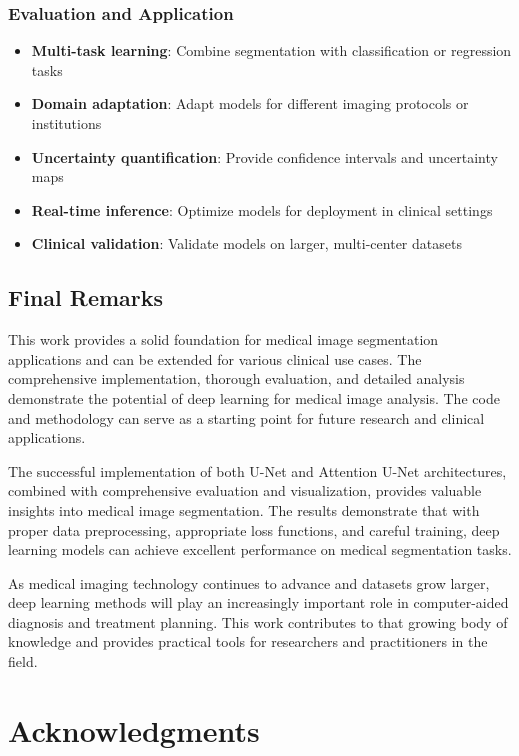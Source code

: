 \documentclass[12pt,a4paper]{article}
\begin{document}
\subsubsection{Evaluation and Application}
\begin{itemize}
    \item \textbf{Multi-task learning}: Combine segmentation with classification or regression tasks
    \item \textbf{Domain adaptation}: Adapt models for different imaging protocols or institutions
    \item \textbf{Uncertainty quantification}: Provide confidence intervals and uncertainty maps
    \item \textbf{Real-time inference}: Optimize models for deployment in clinical settings
    \item \textbf{Clinical validation}: Validate models on larger, multi-center datasets
\end{itemize}

\subsection{Final Remarks}

This work provides a solid foundation for medical image segmentation applications and can be extended for various clinical use cases. The comprehensive implementation, thorough evaluation, and detailed analysis demonstrate the potential of deep learning for medical image analysis. The code and methodology can serve as a starting point for future research and clinical applications.

The successful implementation of both U-Net and Attention U-Net architectures, combined with comprehensive evaluation and visualization, provides valuable insights into medical image segmentation. The results demonstrate that with proper data preprocessing, appropriate loss functions, and careful training, deep learning models can achieve excellent performance on medical segmentation tasks.

As medical imaging technology continues to advance and datasets grow larger, deep learning methods will play an increasingly important role in computer-aided diagnosis and treatment planning. This work contributes to that growing body of knowledge and provides practical tools for researchers and practitioners in the field.

\section{Acknowledgments}
\end{document}

